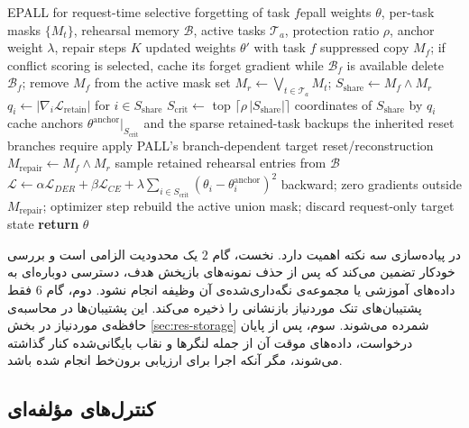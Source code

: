 \begin{alg}{EPALL for request-time selective forgetting of task $f$}{epall}
\Require weights $\theta$, per-task masks $\{M_t\}$, rehearsal memory $\mathcal{B}$, active tasks $\mathcal{T}_a$, protection ratio $\rho$, anchor weight $\lambda$, repair steps $K$
\Ensure updated weights $\theta'$ with task $f$ suppressed
\State copy $M_f$; if conflict scoring is selected, cache its forget gradient while $\mathcal{B}_f$ is available
\State delete $\mathcal{B}_f$; remove $M_f$ from the active mask set 
\State $M_r \gets \bigvee_{t \in \mathcal{T}_a} M_t$; \quad $S_{\mathrm{share}} \gets M_f \wedge M_r$
\State $q_i \gets |\nabla_i \mathcal{L}_{\mathrm{retain}}|$ for $i \in S_{\mathrm{share}}$ 
\State $S_{\mathrm{crit}} \gets$ top $\lceil \rho\,|S_{\mathrm{share}}|\rceil$ coordinates of $S_{\mathrm{share}}$ by $q_i$
\State cache anchors $\theta^{\mathrm{anchor}}|_{S_{\mathrm{crit}}}$ and the sparse retained-task backups the inherited reset branches require
\State apply PALL's branch-dependent target reset/reconstruction
\State $M_{\mathrm{repair}} \gets M_f \wedge M_r$ 
	\State sample retained rehearsal entries from $\mathcal{B}$
	\State $\mathcal{L} \gets \alpha \mathcal{L}_{DER} + \beta \mathcal{L}_{CE} + \lambda \sum_{i \in S_{\mathrm{crit}}} (\theta_i - \theta_i^{\mathrm{anchor}})^2$
	\State backward; zero gradients outside $M_{\mathrm{repair}}$; optimizer step
\EndFor
\State rebuild the active union mask; discard request-only target state
\State \textbf{return} $\theta$
\end{alg}

در پیاده‌سازی سه نکته اهمیت دارد. نخست، گام $2$ یک محدودیت الزامی است و بررسی خودکار تضمین می‌کند که پس از حذف نمونه‌های بازپخش هدف، دسترسی دوباره‌ای به داده‌های آموزشی یا مجموعه‌ی نگه‌داری‌شده‌ی آن وظیفه انجام نشود. دوم، گام $6$ فقط پشتیبان‌های تنک موردنیاز بازنشانی را ذخیره می‌کند. این پشتیبان‌ها در محاسبه‌ی حافظه‌ی موردنیاز در بخش \ref{sec:res-storage} شمرده می‌شوند. سوم، پس از پایان درخواست، داده‌های موقت آن از جمله لنگرها و نقاب بایگانی‌شده کنار گذاشته می‌شوند، مگر آنکه اجرا برای ارزیابی برون‌خط انجام شده باشد.

\subsection{کنترل‌های مؤلفه‌ای}
\label{subsec:prop-controls}

